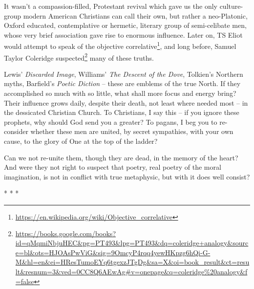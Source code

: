 It wasn't a compassion-filled, Protestant revival which gave us the only culture-group modern American Christians can call their own, but rather a neo-Platonic, Oxford educated, contemplative or hermetic, literary group of semi-celibate men, whose very brief association gave rise to enormous influence. Later on, TS Eliot would attempt to speak of the objective correlative\footnote{\url{https://en.wikipedia.org/wiki/Objective\_correlative}}, and long before, Samuel Taylor Coleridge suspected\footnote{\url{https://books.google.com/books?id=qMqmiNbjuHEC\&pg=PT493\&lpg=PT493\&dq=coleridge+analogy\&source=bl\&ots=HJOAsPwViG\&sig=9OmcyP4rqq4yewHKpzg6hQi-G-M\&hl=en\&ei=HResTumoEYq6tgexzJTgDg\&sa=X\&oi=book\_result\&ct=result\&resnum=3\&ved=0CC8Q6AEwAg\#v=onepage\&q=coleridge\%20analogy\&f=false}} many of these truths.

Lewis' \emph{Discarded Image}, Williams' \emph{The Descent of the Dove}, Tolkien's Northern myths, Barfield's \emph{Poetic Diction} -- these are emblems of the true North. If they accomplished so much with so little, what shall more focus and energy bring? Their influence grows daily, despite their death, not least where needed most -- in the dessicated Christian Church. To Christians, I say this -- if you ignore these prophets, why should God send you a greater? To pagans, I beg you to re-consider whether these men are united, by secret sympathies, with your own cause, to the glory of One at the top of the ladder?

Can we not re-unite them, though they are dead, in the memory of the heart? And were they not right to suspect that poetry, real poetry of the moral imagination, is not in conflict with true metaphysic, but with it does well consist?



\begin{center}* * *\end{center}

